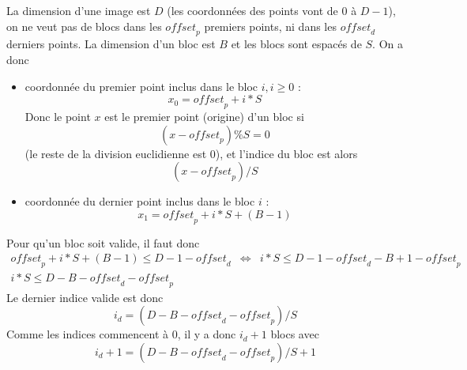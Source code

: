 La dimension d'une image est $D$ (les coordonn\'ees des points vont de $0$ \`a $D-1$), on ne veut pas de blocs dans les $\textit{offset}_p$ premiers points, ni dans les $\textit{offset}_d$ derniers points. La dimension d'un bloc est $B$ 
et les blocs sont espac\'es de $S$. On a donc 
\begin{itemize}
\item coordonn\'ee du premier point inclus dans le bloc $i , i\geq 0$ : 
$$x_0 = \textit{offset}_p + i * S$$ 
Donc le point $x$ est le premier point (origine) d'un bloc si
$$(x - \textit{offset}_p) \% S = 0$$ 
(le reste de la division euclidienne est $0$), et l'indice du bloc est alors  
$$(x - \textit{offset}_p) / S$$
\item coordonn\'ee du dernier point inclus dans le bloc $i$ : 
$$x_1 = \textit{offset}_p + i * S + (B-1)$$
\end{itemize}
Pour qu'un bloc soit valide, il faut donc 
\begin{eqnarray*}
\textit{offset}_p + i * S + (B-1) \leq D - 1 - \textit{offset}_d
& \Longleftrightarrow &
i * S \leq D - 1 - \textit{offset}_d -B +1 - \textit{offset}_p \\
i * S \leq D-B - \textit{offset}_d - \textit{offset}_p
\end{eqnarray*}
Le dernier indice valide est donc 
$$
i_d = \left( D-B - \textit{offset}_d - \textit{offset}_p \right) / S
$$
Comme les indices commencent \`a $0$, il y a donc $i_d +1$ blocs avec
$$
i_d + 1 = \left( D-B - \textit{offset}_d - \textit{offset}_p \right) / S + 1
$$
